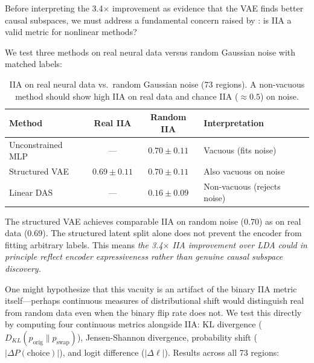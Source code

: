 \documentclass{article}
\begin{document}
Before interpreting the 3.4$\times$ improvement as evidence that the VAE finds better causal subspaces, we must address a fundamental concern raised by \citet{sutter2025iia}: is IIA a valid metric for nonlinear methods?

We test three methods on real neural data versus random Gaussian noise with matched labels:

\begin{table}[h]
\centering
\small
\caption{IIA on real neural data vs.\ random Gaussian noise (73 regions). A non-vacuous method should show high IIA on real data and chance IIA ($\approx 0.5$) on noise.}
\label{tab:sutter}
\begin{tabular}{lccl}
\toprule
Method & Real IIA & Random IIA & Interpretation \\
\midrule
Unconstrained MLP & --- & $0.70 \pm 0.11$ & Vacuous (fits noise) \\
Structured VAE & $0.69 \pm 0.11$ & $0.70 \pm 0.11$ & Also vacuous on noise \\
Linear DAS & --- & $0.16 \pm 0.09$ & Non-vacuous (rejects noise) \\
\bottomrule
\end{tabular}
\end{table}

The structured VAE achieves comparable IIA on random noise ($0.70$) as on real data ($0.69$). The structured latent split alone does not prevent the encoder from fitting arbitrary labels. This means \emph{the 3.4$\times$ IIA improvement over LDA could in principle reflect encoder expressiveness rather than genuine causal subspace discovery.}

One might hypothesize that this vacuity is an artifact of the binary IIA metric itself---perhaps continuous measures of distributional shift would distinguish real from random data even when the binary flip rate does not. We test this directly by computing four continuous metrics alongside IIA: KL divergence ($D_{KL}(p_{\text{orig}} \| p_{\text{swap}})$), Jensen-Shannon divergence, probability shift ($|\Delta P(\text{choice})|$), and logit difference ($|\Delta \ell|$). Results across all 73 regions:
\end{document}
